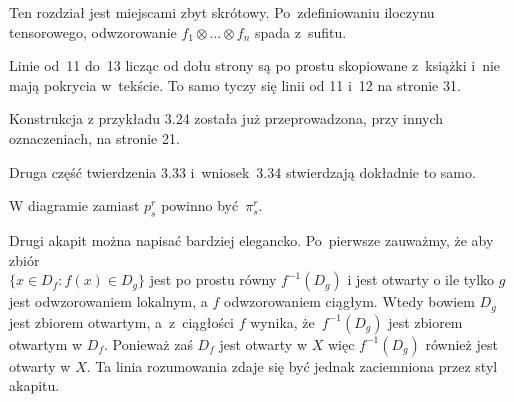 \documentclass[a4paper,11pt]{article}
\numberwithin{equation}{section}
\begin{document}
\vspace{\VerSpaceFour}





\noindent
{} Ten rozdział jest miejscami zbyt skrótowy. Po~zdefiniowaniu
iloczynu tensorowego, odwzorowanie $f_{ 1 } \otimes \ldots \otimes f_{ n }$ spada z~sufitu.

\vspace{\VerSpaceFour}





\noindent
{} Linie od~11 do~13 licząc od dołu strony są po prostu skopiowane
z~książki \cite{GancarzewiczAlgebraLiniowa2004} i~nie mają pokrycia
w~tekście. To samo tyczy się linii od 11 i~12 na stronie 31.

\vspace{\VerSpaceFour}





\noindent
{} Konstrukcja z przykładu 3.24 została już przeprowadzona, przy
innych oznaczeniach, na stronie 21.

\vspace{\VerSpaceFour}





\noindent
{} Druga część twierdzenia 3.33 i~wniosek~3.34 stwierdzają dokładnie
to samo.

\vspace{\VerSpaceFour}





\noindent
{} W diagramie zamiast $p^{ r }_{ s }$ powinno być~$\pi^{ r }_{ s }$.

\vspace{\spaceFour}





\noindent
{} Drugi akapit można napisać bardziej elegancko. Po~pierwsze
zauważmy, że aby zbiór \\
$\{ x \in D_{ f } : f( x ) \in D_{ g } \}$ jest po prostu równy
$f^{ -1 }( D_{ g } )$ i jest otwarty o ile tylko $g$ jest
odwzorowaniem lokalnym, a $f$ odwzorowaniem ciągłym. Wtedy bowiem
$D_{ g }$ jest zbiorem otwartym, a~z~ciągłości $f$ wynika,
że~$f^{ -1 }( D_{ g } )$ jest zbiorem otwartym w $D_{ f }$. Ponieważ
zaś $D_{ f }$ jest otwarty w $X$ więc $f^{ -1 }( D_{ g } )$ również
jest otwarty w $X$. Ta linia rozumowania zdaje się być jednak
zaciemniona przez styl akapitu.
\end{document}
